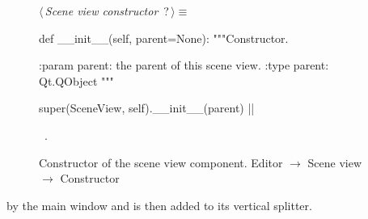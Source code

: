 \documentclass[%
    a4paper,    %
    justified,  %
    nobib,      %
    openany     %
]{tufte-book}
\begin{document}
\begin{figure}
\begin{flushleft} \small
\begin{minipage}{\linewidth}\label{scrap82}\raggedright\small
{} $\langle\,${\itshape Scene view constructor}\nobreak\ {\footnotesize {?}}$\,\rangle\equiv$
\vspace{-1ex}
\begin{pythoncode}
def __init__(self, parent=None):
    """Constructor.

    :param parent: the parent of this scene view.
    :type parent: Qt.QObject
    """

    super(SceneView, self).__init__(parent)
|\NWsep|
\end{pythoncode}
\vspace{1.5ex}
\footnotesize
\begin{list}{}{\setlength{\itemsep}{-\parsep}\setlength{\itemindent}{-\leftmargin}}
\item \NWtxtMacroRefIn\ .

\item{}
\end{list}
\end{minipage}\vspace{4ex}
\end{flushleft}
\caption{Constructor of the scene view component.
  \newline{}\newline{}Editor $\rightarrow$ Scene view $\rightarrow$ Constructor}
\label{editor:lst:scene-view:constructor}
\end{figure}

 by the main window and is then added to its
vertical splitter.
\end{document}
